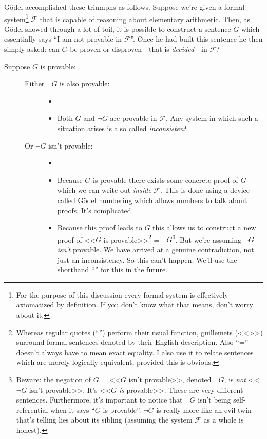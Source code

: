 \documentclass{article}
\newcommand{\F}{\ensuremath{\mathcal{F}}}
\begin{document}
Gödel accomplished these triumphs as follows. Suppose we're given a formal system\footnote{For the purpose of this discussion every formal system is effectively axiomatized by definition. If you don't know what that means, don't worry about it.} $\F$ that is capable of reasoning about elementary arithmetic. Then, as Gödel showed through a lot of toil, it is possible to construct a sentence $G$ which essentially says ``I am not provable in $\F$''. Once he had built this sentence he then simply asked: can $G$ be proven or disproven---that is \textit{decided}---in $\F$?

\begin{description}
\item[Suppose $G$ is provable:]
\begin{description}
\item[]
\item[Either $\neg G$ is also provable:]
\begin{itemize}
\item[]
\item Both $G$ and $\neg G$ are provable in $\F$. Any system in which such a situation arises is also called \textit{inconsistent}.
\end{itemize}
\item[Or $\neg G$ isn't provable:]
\begin{itemize}
\item[]
\item Because $G$ is provable there exists some concrete proof of $G$ which we can write out \textit{inside} $\F$. This is done using a device called Gödel numbering which allows numbers to talk about proofs. It's complicated.
\item Because this proof leads to $G$ this allows us to construct a new proof of <<$G$ is provable>>\footnote{Whereas regular quotes (``'') perform their usual function, guillemets (<<>>) surround formal sentences denoted by their English description. Also ``='' doesn't always have to mean exact equality. I also use it to relate sentences which are merely logically equivalent, provided this is obvious.} = $\neg G$\footnote{Beware: the negation of $G$ = <<$G$ isn't provable>>, denoted $\neg G$, is \textit{not} <<$\neg G$ isn't provable>>. It's <<$G$ \textit{is} provable>>. These are very different sentences. Furthermore, it's important to notice that $\neg G$ isn't being self-referential when it says ``$G$ is provable''. $\neg G$ is really more like an evil twin that's telling lies about its sibling (assuming the system $\F$  as a whole is honest).}. But we're assuming $\neg G$ \textit{isn't} provable. We have arrived at a genuine contradiction, not just an inconsistency. So this can't happen. We'll use the shorthand ``\lightning'' for this in the future.

\end{itemize}
\end{description}
\end{description}
\end{document}
